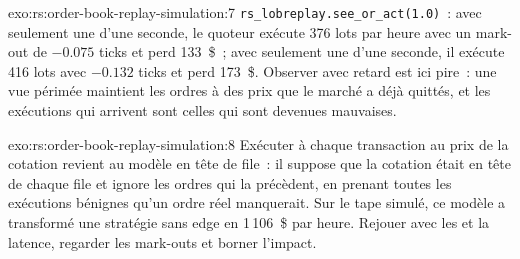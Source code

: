 \begin{solution}{exo:rs:order-book-replay-simulation:7}
\texttt{rs\_lobreplay.see\_or\_act(1.0)}~: avec seulement une  d'une seconde, le quoteur exécute 376 lots par heure avec un mark-out de $-0.075$ ticks et perd
133~\$~; avec seulement une  d'une seconde, il exécute 416 lots avec $-0.132$ ticks et perd 173~\$. Observer avec retard est ici pire~: une vue périmée maintient les ordres à
des prix que le marché a déjà quittés, et les exécutions qui arrivent sont celles qui sont devenues mauvaises.
\end{solution}

\begin{solution}{exo:rs:order-book-replay-simulation:8}
Exécuter à chaque transaction au prix de la cotation revient au modèle en tête de file~: il suppose que la cotation était en tête de chaque file et ignore les ordres qui la précèdent, en prenant
toutes les exécutions bénignes qu'un ordre réel manquerait. Sur le tape simulé, ce modèle a transformé une stratégie sans edge en 1\,106~\$ par heure. Rejouer avec les  et
la latence, regarder les mark-outs et borner l'impact.
\end{solution}

